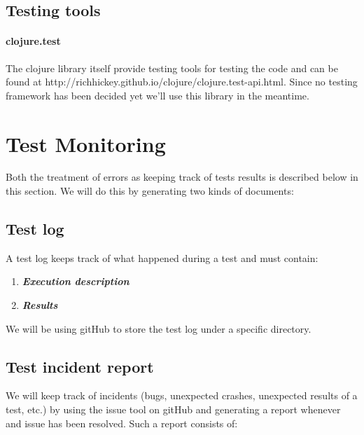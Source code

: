 \documentclass[12pt]{article}
\begin{document}
\subsection{Testing tools}\label{testing-tools}

\paragraph{clojure.test}\label{clojure.test}

The clojure library itself provide testing tools for testing the code
and can be found at 
http://richhickey.github.io/clojure/clojure.test-api.html. Since
no testing framework has been decided yet we'll use this library in the
meantime.

\section{Test Monitoring}\label{test-monitoring}

Both the treatment of errors as keeping track of tests results is
described below in this section. We will do this by generating two kinds
of documents:

\subsection{Test log}\label{test-log}

A test log keeps track of what happened during a test and must contain:

\begin{enumerate}
\def\labelenumi{\arabic{enumi}.}
\item
  \textbf{\emph{Execution description}}
\item
  \textbf{\emph{Results}}
\end{enumerate}

We will be using gitHub to store the test log under a specific
directory.

\subsection{Test incident report}\label{test-incident-report}

We will keep track of incidents (bugs, unexpected crashes, unexpected
results of a test, etc.) by using the issue tool on gitHub and
generating a report whenever and issue has been resolved. Such a report
consists of:
\end{document}
